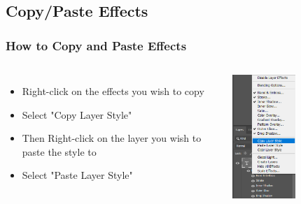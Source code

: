 \documentclass{beamer}
\begin{document}
\subsection{Copy/Paste Effects}
\begin{frame}
	\frametitle{How to Copy and Paste Effects}
			\begin{columns}
	\begin{itemize}
		\item Right-click on the effects you wish to copy
		\item Select "Copy Layer Style"
		\item Then Right-click on the layer you wish to paste the style to
		\item Select "Paste Layer Style"
	\end{itemize}
	\begin{center}
			
			\includegraphics[width = 0.5\textwidth]{images/copy layer style.png}
	\end{center}
	\end{columns}
\end{frame}
\end{document}
